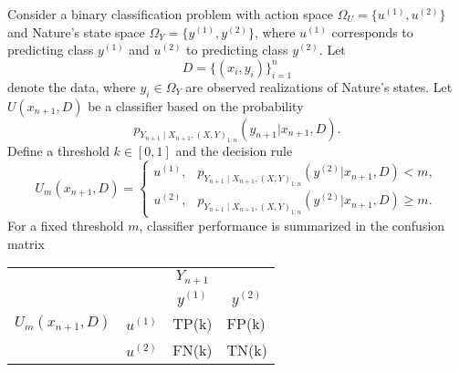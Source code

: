 \begin{example}
	\label{ex:confusion}
	Consider a binary classification problem with action space $\Omega_U = \{u^{(1)},u^{(2)}\}$ and Nature's state space $\Omega_Y = \{y^{(1)}, y^{(2)}\}$, where $u^{(1)}$ corresponds to predicting class $y^{(1)}$ and $u^{(2)}$ to predicting class $y^{(2)}$. Let
	\begin{equation}
		D = \{(x_i,y_i)\}_{i=1}^n
	\end{equation}
	denote the data, where $y_i \in \Omega_Y$ are observed realizations of Nature's states. Let $U(x_{n+1},D)$ be a classifier based on the probability 
	\begin{equation}
		p_{Y_{n+1}\mid X_{n+1}, (X,Y)_{1\colon n}}(y_{n+1} | x_{n+1}, D).
	\end{equation}
	Define a threshold $k\in[0,1]$ and the decision rule
	\begin{equation}
		U_m(x_{n+1},D) =
		\begin{cases}
			u^{(1)}, & p_{Y_{n+1}\mid X_{n+1}, (X,Y)_{1\colon n}}(y^{(2)} | x_{n+1}, D) < m,\\
			u^{(2)}, & p_{Y_{n+1}\mid X_{n+1}, (X,Y)_{1\colon n}}(y^{(2)} | x_{n+1}, D) \ge m.
		\end{cases}
		\label{eq:decision_rule31}
	\end{equation}
	For a fixed threshold $m$, classifier performance is summarized in the confusion matrix
	\begin{center}
		\begin{tabular}{ c  c  c c}
			&& $Y_{n+1}$ &  \\
			&& $y^{(1)}$ & $y^{(2)}$ \\
			\cline{3-4}
			$U_m(x_{n+1},D)$ & $u^{(1)}$& \multicolumn{1}{|l}{TP(k)} & \multicolumn{1}{l|}{FP(k)}\\
			& $u^{(2)}$& \multicolumn{1}{|l}{FN(k)} & \multicolumn{1}{l|}{TN(k)}\\
			\cline{3-4}
		\end{tabular}
	\end{center}
\end{example}

